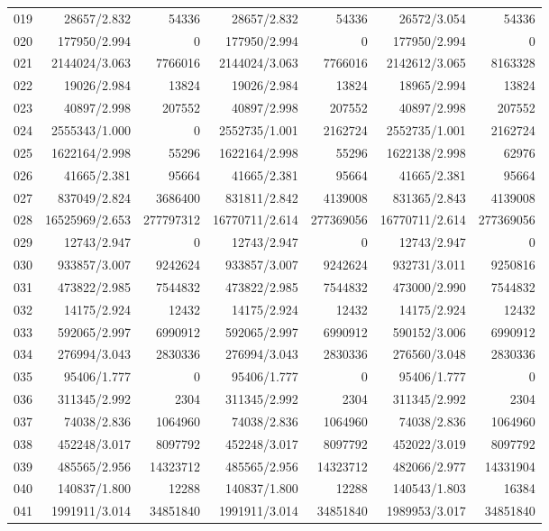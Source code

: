 \begin{longtable}{crrrrrr}
019 & 28657/2.832 & 54336 & 28657/2.832 & 54336 & 26572/3.054 & 54336 \\
020 & 177950/2.994 & 0 & 177950/2.994 & 0 & 177950/2.994 & 0 \\
021 & 2144024/3.063 & 7766016 & 2144024/3.063 & 7766016 & 2142612/3.065 & 8163328 \\
022 & 19026/2.984 & 13824 & 19026/2.984 & 13824 & 18965/2.994 & 13824 \\
023 & 40897/2.998 & 207552 & 40897/2.998 & 207552 & 40897/2.998 & 207552 \\
024 & 2555343/1.000 & 0 & 2552735/1.001 & 2162724 & 2552735/1.001 & 2162724 \\
025 & 1622164/2.998 & 55296 & 1622164/2.998 & 55296 & 1622138/2.998 & 62976 \\
026 & 41665/2.381 & 95664 & 41665/2.381 & 95664 & 41665/2.381 & 95664 \\
027 & 837049/2.824 & 3686400 & 831811/2.842 & 4139008 & 831365/2.843 & 4139008 \\
028 & 16525969/2.653 & 277797312 & 16770711/2.614 & 277369056 & 16770711/2.614 & 277369056 \\
029 & 12743/2.947 & 0 & 12743/2.947 & 0 & 12743/2.947 & 0 \\
030 & 933857/3.007 & 9242624 & 933857/3.007 & 9242624 & 932731/3.011 & 9250816 \\
031 & 473822/2.985 & 7544832 & 473822/2.985 & 7544832 & 473000/2.990 & 7544832 \\
032 & 14175/2.924 & 12432 & 14175/2.924 & 12432 & 14175/2.924 & 12432 \\
033 & 592065/2.997 & 6990912 & 592065/2.997 & 6990912 & 590152/3.006 & 6990912 \\
034 & 276994/3.043 & 2830336 & 276994/3.043 & 2830336 & 276560/3.048 & 2830336 \\
035 & 95406/1.777 & 0 & 95406/1.777 & 0 & 95406/1.777 & 0 \\
036 & 311345/2.992 & 2304 & 311345/2.992 & 2304 & 311345/2.992 & 2304 \\
037 & 74038/2.836 & 1064960 & 74038/2.836 & 1064960 & 74038/2.836 & 1064960 \\
038 & 452248/3.017 & 8097792 & 452248/3.017 & 8097792 & 452022/3.019 & 8097792 \\
039 & 485565/2.956 & 14323712 & 485565/2.956 & 14323712 & 482066/2.977 & 14331904 \\
040 & 140837/1.800 & 12288 & 140837/1.800 & 12288 & 140543/1.803 & 16384 \\
041 & 1991911/3.014 & 34851840 & 1991911/3.014 & 34851840 & 1989953/3.017 & 34851840 \\

\end{longtable}
